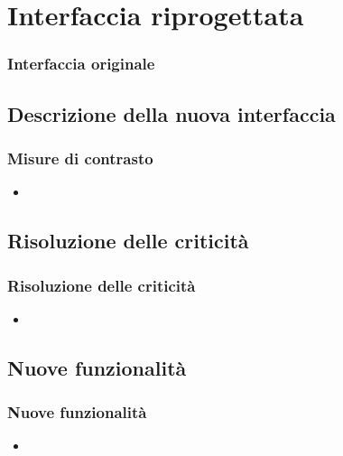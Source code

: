 \documentclass[../../main.tex]{subfiles}
\begin{document}
    
    \section{Interfaccia riprogettata}

    \begin{frame}
        \frametitle{Interfaccia originale}

        

    \end{frame}


    \subsection{Descrizione della nuova interfaccia}

    \begin{frame}
        \frametitle{Misure di contrasto}

        \begin{itemize}
            \item
        \end{itemize}  

    \end{frame}

    \subsection{Risoluzione delle criticità}

    \begin{frame}
        \frametitle{Risoluzione delle criticità}

        \begin{itemize}
            \item
        \end{itemize}    

    \end{frame}

    \subsection{Nuove funzionalità}

    \begin{frame}
        \frametitle{Nuove funzionalità}

        \begin{itemize}
            \item          

        \end{itemize}

    \end{frame}
\end{document}
